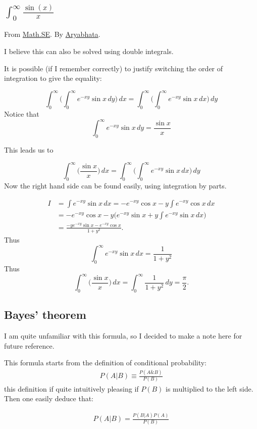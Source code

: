 \subsection{\texorpdfstring{$\int_0^\infty \frac{\sin(x)}{x}$}{}}
From \href{http://math.stackexchange.com/questions/5248/solving-the-integral-int-0-infty-frac-sinxx-dx-frac-pi2}{Math.SE}. 
By \href{http://math.stackexchange.com/users/1102/aryabhata}{Aryabhata}.

I believe this can also be solved using double integrals.

It is possible (if I remember correctly) to justify switching the order of integration to give the equality:

$$\int_{0}^{\infty} \Bigg(\int_{0}^{\infty} e^{-xy} \sin x \,dy \Bigg)\, dx = \int_{0}^{\infty} \Bigg(\int_{0}^{\infty} e^{-xy} \sin x \,dx \Bigg)\,dy$$
Notice that
$$\int_{0}^{\infty} e^{-xy} \sin x\,dy = \frac{\sin x}{x}$$

This leads us to

$$\int_{0}^{\infty} \Big(\frac{\sin x}{x} \Big) \,dx = \int_{0}^{\infty} \Bigg(\int_{0}^{\infty} e^{-xy} \sin x \,dx \Bigg)\,dy$$
Now the right hand side can be found easily, using integration by parts.

\begin{align*}
I &= \int e^{-xy} \sin x \,dx = -e^{-xy}{\cos x} - y \int e^{-xy} \cos x \, dx\\
&= -e^{-xy}{\cos x} - y \Big(e^{-xy}\sin x + y \int e^{-xy} \sin x \,dx \Big)\\
&= \frac{-ye^{-xy}\sin x - e^{-xy}\cos x}{1+y^2}.
\end{align*}
Thus $$\int_{0}^{\infty} e^{-xy} \sin x \,dx = \frac{1}{1+y^2}$$
Thus $$\int_{0}^{\infty} \Big(\frac{\sin x}{x} \Big) \,dx = \int_{0}^{\infty}\frac{1}{1+y^2}\,dy = \frac{\pi}{2}.$$

\subsection{Bayes' theorem}
\label{sec:Bayes-theorem}
I am quite unfamiliar with this formula, so I decided to make a note
here for future reference.

This formula starts from the definition of conditional probability:
\begin{align}
P(A|B)\equiv \frac{P(A\&B)}{P(B)}
\end{align}
this definition if quite intuitively pleasing if $P(B)$ is multiplied
to the left side. Then one easily deduce that:
\begin{thm} \begin{align}
   	P(A|B)=\frac{P(B|A)P(A)}{P(B)}
   	\end{align} \end{thm}

